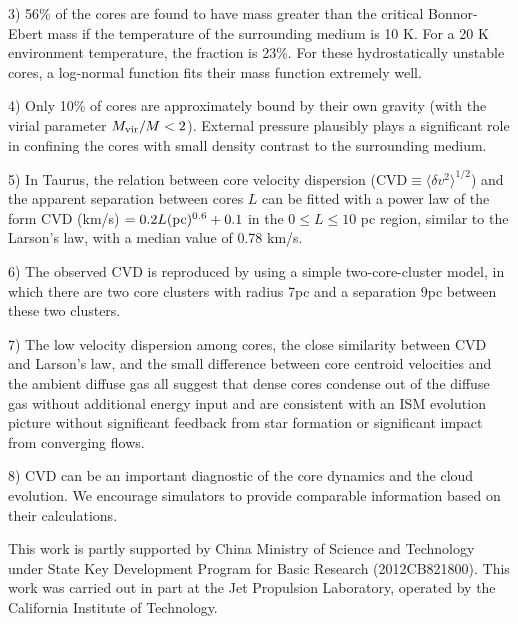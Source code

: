 \documentclass[12pt,preprint]{aastex}
\begin{document}
3) 56\% of the cores are found to have mass greater than  the critical Bonnor-Ebert mass if the temperature of the surrounding medium is 10 K. For a 20 K environment temperature, the fraction is 23\%. For these hydrostatically unstable cores, a log-normal function fits their mass function extremely well.

4) Only 10\% of cores are approximately  bound by their own gravity (with the virial parameter $M_{\rm vir}/M<2$).
External pressure plausibly plays a significant role in confining the cores with small density contrast to the surrounding medium.

5) In Taurus, the relation between core velocity dispersion (CVD$\equiv \langle\delta v^2\rangle^{1/2}$) and the apparent separation
between cores $L$ can be fitted with a power law of the form CVD (km/s) $=0.2L ({\rm pc})^{0.6}+0.1$ in the $ 0 \leq L \leq 10$ pc region, similar to the Larson's law, with a median value of 0.78 km/s.

6) The observed CVD is reproduced by using a simple two-core-cluster model, in which there are two core clusters with radius 7pc and a separation 9pc between these two clusters.

7) The low velocity dispersion among cores, the close similarity between CVD and Larson's law, and the small difference between core centroid velocities and the ambient diffuse gas all suggest that dense cores condense out of the diffuse gas without additional energy input and are consistent with an ISM evolution picture without significant feedback from star formation or significant impact from converging flows.

8) CVD can be an important diagnostic of the core dynamics and the cloud evolution. We encourage simulators to provide comparable information based on their calculations.








\acknowledgments
This work is partly supported by  China Ministry of Science and Technology under State Key Development Program for Basic Research (2012CB821800). This work was carried out in part at the Jet Propulsion Laboratory, operated by the California Institute of Technology.

\clearpage
\end{document}
